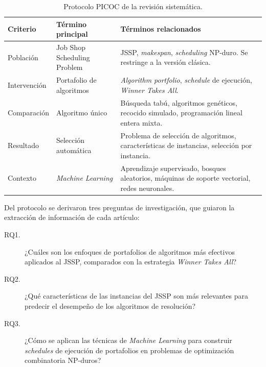 \begin{table}[H]
  \centering
  \small
  \singlespacing
  \caption{Protocolo PICOC de la revisión sistemática.}
  \label{tab:picoc}
  \begin{tabularx}{\textwidth}{>{\raggedright\arraybackslash}p{}
                               >{\raggedright\arraybackslash}p{}
                               >{\raggedright\arraybackslash}X}
    \toprule
    \textbf{Criterio} & \textbf{Término principal} & \textbf{Términos relacionados} \\
    \midrule
    Población    & Job Shop Scheduling Problem & JSSP, \textit{makespan},
      \textit{scheduling} NP-duro. Se restringe a la versión clásica. \\
    Intervención & Portafolio de algoritmos & \textit{Algorithm portfolio},
      \textit{schedule} de ejecución, \textit{Winner Takes All}. \\
    Comparación  & Algoritmo único & Búsqueda tabú, algoritmos genéticos,
      recocido simulado, programación lineal entera mixta. \\
    Resultado    & Selección automática & Problema de selección de
      algoritmos, características de instancias, selección por instancia. \\
    Contexto     & \textit{Machine Learning} & Aprendizaje supervisado,
      bosques aleatorios, máquinas de soporte vectorial, redes neuronales. \\
    \bottomrule
  \end{tabularx}
\end{table}

Del protocolo se derivaron tres preguntas de investigación, que guiaron la
extracción de información de cada artículo:

\begin{description}
  \item[RQ1.] ¿Cuáles son los enfoques de portafolios de algoritmos más
    efectivos aplicados al JSSP, comparados con la estrategia
    \textit{Winner Takes All}?
  \item[RQ2.] ¿Qué características de las instancias del JSSP son más
    relevantes para predecir el desempeño de los algoritmos de resolución?
  \item[RQ3.] ¿Cómo se aplican las técnicas de \textit{Machine Learning} para
    construir \textit{schedules} de ejecución de portafolios en problemas de
    optimización combinatoria NP-duros?
\end{description}

